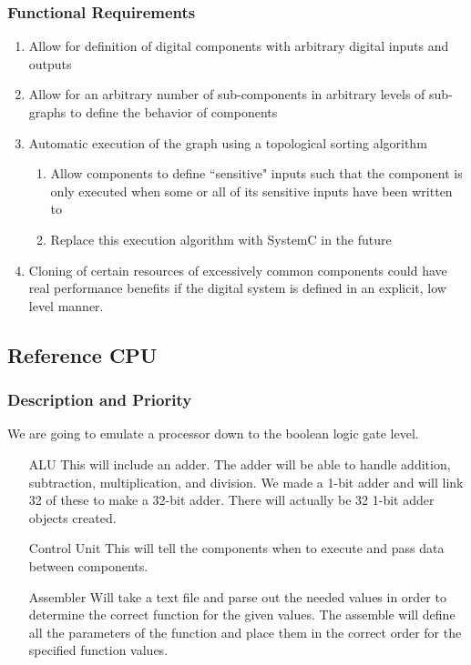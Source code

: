 \documentclass[12pt]{article}
\begin{document}
\subsubsection{Functional Requirements}
\begin{enumerate}
\item Allow for definition of digital components with arbitrary digital inputs and outputs
\item Allow for an arbitrary number of sub-components in arbitrary levels of sub-graphs to define the behavior of components
\item Automatic execution of the graph using a topological sorting algorithm
\begin{enumerate}
\item Allow components to define ``sensitive" inputs such that the component is only executed when some or all of its sensitive inputs have been written to
\item Replace this execution algorithm with SystemC in the future
\end{enumerate}
\item Cloning of certain resources of excessively common components could have real performance benefits if the digital system is defined in an explicit, low level manner.
\end{enumerate}

\subsection{Reference CPU}

\subsubsection{Description and Priority}
We are going to emulate a processor down to the boolean logic gate level.
\begin{enumerate}
\item[ALU] This will include an adder. The adder will be able to handle addition, subtraction, multiplication, and division. We made a 1-bit adder and will link 32 of these to make a 32-bit adder. There will actually be 32 1-bit adder objects created.
\item[Control Unit] This will tell the components when to execute and pass data between components.
\item[Assembler] Will take a text file and parse out the needed values in order to determine the correct function for the given values. The assemble will define all the parameters of the function and place them in the correct order for the specified function values. 
\end{enumerate}
\end{document}
